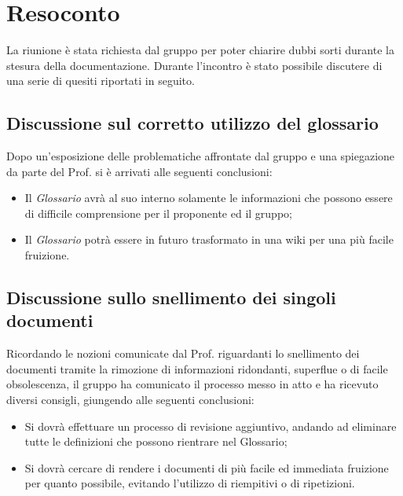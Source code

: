 \newpage


\section{Resoconto}
La riunione è stata richiesta dal gruppo \textit{\Gruppo{}} per poter chiarire dubbi sorti durante la stesura della documentazione.
Durante l'incontro è stato possibile discutere di una serie di quesiti riportati in seguito.
\subsection{Discussione sul corretto utilizzo del glossario}
Dopo un'esposizione delle problematiche affrontate dal gruppo e una spiegazione da parte del Prof. \textit{\Tullio{}} si è arrivati alle seguenti conclusioni:
\begin{itemize}
	\item Il \textit{Glossario} avrà al suo interno solamente le informazioni che possono essere di difficile comprensione per il proponente ed il gruppo;
	\item Il \textit{Glossario} potrà essere in futuro trasformato in una wiki per una più facile fruizione.
\end{itemize}
\subsection{Discussione sullo snellimento dei singoli documenti}
Ricordando le nozioni comunicate dal Prof. \textit{\Tullio{}} riguardanti lo snellimento dei documenti tramite la rimozione di informazioni ridondanti, superflue o di facile obsolescenza, il gruppo ha comunicato il processo messo in atto e ha ricevuto diversi consigli, giungendo alle seguenti conclusioni:
\begin{itemize}
	\item Si dovrà effettuare un processo di revisione aggiuntivo, andando ad eliminare tutte le definizioni che possono rientrare nel Glossario;
	\item Si dovrà cercare di rendere i documenti di più facile ed immediata fruizione per quanto possibile, evitando l'utilizzo di riempitivi o di ripetizioni.
\end{itemize}
